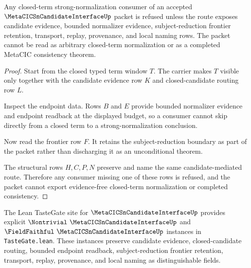 \begin{theorem}
\label{thm:metacic-sn-candidate-frontier-refusal}
Any closed-term strong-normalization consumer of an accepted $\MetaCICSnCandidateInterfaceUp$ packet is refused unless the route exposes candidate evidence, bounded normalizer evidence, subject-reduction frontier retention, transport, replay, provenance, and local naming rows. The packet cannot be read as arbitrary closed-term normalization or as a completed MetaCIC consistency theorem.
\end{theorem}
\begin{proof}
Start from the closed typed term window $T$. The carrier makes $T$ visible only together with the candidate evidence row $K$ and closed-candidate routing row $L$.

Inspect the endpoint data. Rows $B$ and $E$ provide bounded normalizer evidence and endpoint readback at the displayed budget, so a consumer cannot skip directly from a closed term to a strong-normalization conclusion.

Now read the frontier row $F$. It retains the subject-reduction boundary as part of the packet rather than discharging it as an unconditional theorem.

The structural rows $H,C,P,N$ preserve and name the same candidate-mediated route. Therefore any consumer missing one of these rows is refused, and the packet cannot export evidence-free closed-term normalization or completed consistency.
\end{proof}



The Lean TasteGate site for $\MetaCICSnCandidateInterfaceUp$ provides explicit $\Nontrivial\ \MetaCICSnCandidateInterfaceUp$ and $\FieldFaithful\ \MetaCICSnCandidateInterfaceUp$ instances in \texttt{TasteGate.lean}. These instances preserve candidate evidence, closed-candidate routing, bounded endpoint readback, subject-reduction frontier retention, transport, replay, provenance, and local naming as distinguishable fields.

